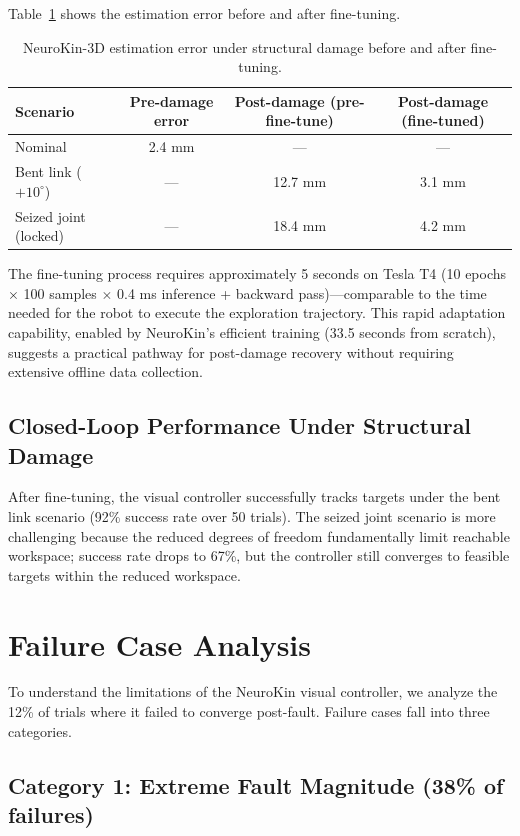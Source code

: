 \documentclass[12pt,a4paper,oneside]{report}
\begin{document}
Table~\ref{tab:damage_recovery} shows the estimation error before and after fine-tuning.

\begin{table}[H]
\centering
\caption{NeuroKin-3D estimation error under structural damage before and after fine-tuning.}
\label{tab:damage_recovery}
\begin{tabular}{lccc}
\toprule
\textbf{Scenario} & \textbf{Pre-damage error} & \textbf{Post-damage (pre-fine-tune)} & \textbf{Post-damage (fine-tuned)} \\
\midrule
Nominal & 2.4 mm & — & — \\
Bent link ($+10^\circ$) & — & 12.7 mm & 3.1 mm \\
Seized joint (locked) & — & 18.4 mm & 4.2 mm \\
\bottomrule
\end{tabular}
\end{table}

The fine-tuning process requires approximately 5 seconds on Tesla T4 (10 epochs $\times$ 100 samples $\times$ 0.4 ms inference + backward pass)—comparable to the time needed for the robot to execute the exploration trajectory. This rapid adaptation capability, enabled by NeuroKin's efficient training (33.5 seconds from scratch), suggests a practical pathway for post-damage recovery without requiring extensive offline data collection.

\subsection{Closed-Loop Performance Under Structural Damage}

After fine-tuning, the visual controller successfully tracks targets under the bent link scenario (92\% success rate over 50 trials). The seized joint scenario is more challenging because the reduced degrees of freedom fundamentally limit reachable workspace; success rate drops to 67\%, but the controller still converges to feasible targets within the reduced workspace.

\section{Failure Case Analysis}

To understand the limitations of the NeuroKin visual controller, we analyze the 12\% of trials where it failed to converge post-fault. Failure cases fall into three categories.

\subsection{Category 1: Extreme Fault Magnitude (38\% of failures)}
\end{document}
